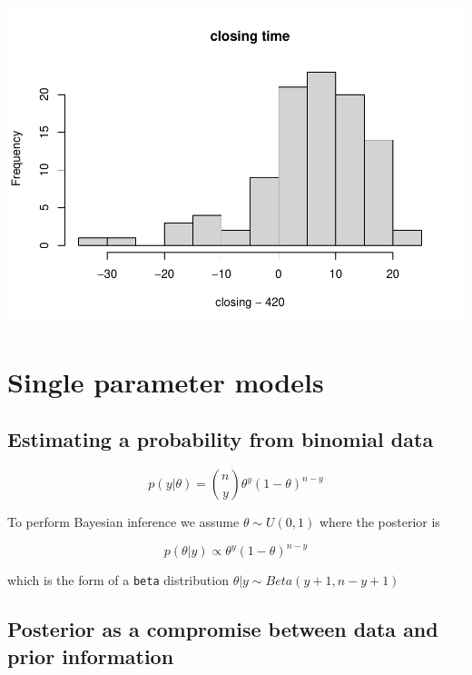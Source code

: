 \documentclass[
]{book}
\theoremstyle{definition}
\theoremstyle{definition}
\theoremstyle{definition}
\theoremstyle{definition}
\theoremstyle{remark}
\begin{document}
\includegraphics{_main_files/figure-latex/unnamed-chunk-10-4.pdf}

\hypertarget{cross}{%
\chapter{Single parameter models}\label{cross}}

\hypertarget{estimating-a-probability-from-binomial-data}{%
\section{Estimating a probability from binomial data}\label{estimating-a-probability-from-binomial-data}}

\begin{equation}
p(y  | \theta) = {n \choose y}\theta^y(1-\theta)^{n-y}
\label{eq:binomialProb}
\end{equation}

To perform Bayesian inference we assume \(\theta \sim U(0,1)\) where the posterior is

\begin{equation}
p(\theta | y) \propto \theta^y(1-\theta)^{n-y}
\label{eq:binomialPosterior}
\end{equation}

which is the form of a \texttt{beta} distribution \(\theta | y \sim Beta(y+1, n-y+1)\)

\hypertarget{posterior-as-a-compromise-between-data-and-prior-information}{%
\section{Posterior as a compromise between data and prior information}\label{posterior-as-a-compromise-between-data-and-prior-information}}
\end{document}
